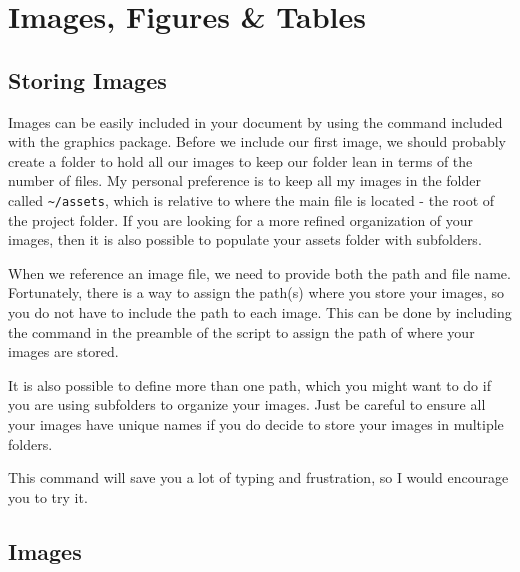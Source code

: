 \chapter{Images, Figures \& Tables}

\section{Storing Images}

Images can be easily included in your document by using the 
command included with the graphics package. Before we include our first image, we 
should probably create a folder to hold all our images to keep our folder 
lean in terms of the number of files.  My personal preference is to keep all my 
images in the folder called \verb!~/assets!, which is relative to where the 
main file is located - the root of the project folder. If you are looking for 
a more refined organization of your images, then it is also possible to 
populate your assets folder with subfolders.

When we reference an image file, we need to provide both the path and file name.
Fortunately, there is a way to assign the path(s) where you store your images,
so you do not have to include the path to each image.  This can be done by 
including the  command in the preamble of the script to assign
the path of where your images are stored.
\begin{dispListing}
\graphicspath{{/assets/}}
\end{dispListing}
It is also possible to define more than one path, which you might want to do 
if you are using subfolders to organize your images.  Just be careful to 
ensure all your images have unique names if you do decide to store your 
images in multiple folders.
\begin{dispListing}
\graphicspath{{/assets/images}{/assets/pdfs/}{/assets/matplotlib/}{/assets/tikz/}}
\end{dispListing}
This command will save you a lot of typing and frustration, so I would 
encourage you to try it.

\section{Images}

